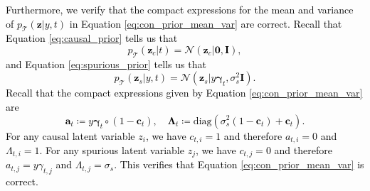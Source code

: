 \documentclass[10pt]{article} %
\theoremstyle{plain}
\theoremstyle{definition}
\begin{document}
\textcolor{black}{
Furthermore, we verify that the compact expressions for the mean and variance of $p_{\mathcal{T}}(\mathbf{z}|y,t)$ in Equation \eqref{eq:con_prior_mean_var} are correct. Recall that Equation \eqref{eq:causal_prior} tells us that
\begin{equation}
    p_{\mathcal{T}}(\mathbf{z}_c|t)=\mathcal{N}(\mathbf{z}_c|\mathbf{0},\mathbf{I}),
\end{equation}
and Equation \eqref{eq:spurious_prior} tells us that
\begin{equation}
    p_{\mathcal{T}}(\mathbf{z}_s|y,t)=\mathcal{N}(\mathbf{z}_s|y\boldsymbol{\gamma}_t,\sigma_s^2\mathbf{I}).
\end{equation}
Recall that the compact expressions given by Equation \eqref{eq:con_prior_mean_var} are
\begin{equation}
    \mathbf{a}_t\coloneqq y\boldsymbol{\gamma}_t\circ(1-\mathbf{c}_t),\quad
    \boldsymbol{\Lambda}_t\coloneqq \text{diag}(\sigma_{s}^{2}(1-\mathbf{c}_t)+\mathbf{c}_t).
\end{equation}
For any causal latent variable $z_i$, we have $c_{t,i}=1$ and therefore $a_{t,i}=0$ and $\Lambda_{t,i}=1$. 
For any spurious latent variable $z_j$, we have $c_{t,j}=0$ and therefore $a_{t,j}=y\gamma_{t,j}$ and $\Lambda_{t,j}=\sigma_s$.
This verifies that Equation \eqref{eq:con_prior_mean_var} is correct.
}
\end{document}
